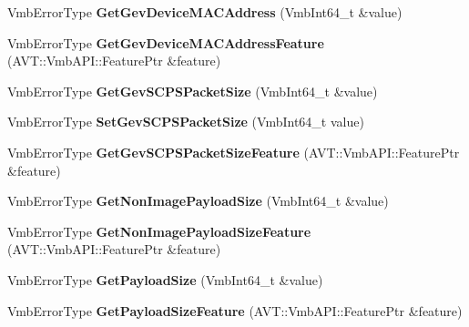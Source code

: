 \begin{DoxyCompactItemize}
\item 
\hypertarget{classMakoCamera_a34e9bc9f5b2c9c218f73f3452f5e5894}{Vmb\-Error\-Type {\bfseries Get\-Gev\-Device\-M\-A\-C\-Address} (Vmb\-Int64\-\_\-t \&value)}\label{classMakoCamera_a34e9bc9f5b2c9c218f73f3452f5e5894}

\item 
\hypertarget{classMakoCamera_abe623f54144fc10ab2dabb682af8cb3a}{Vmb\-Error\-Type {\bfseries Get\-Gev\-Device\-M\-A\-C\-Address\-Feature} (A\-V\-T\-::\-Vmb\-A\-P\-I\-::\-Feature\-Ptr \&feature)}\label{classMakoCamera_abe623f54144fc10ab2dabb682af8cb3a}

\item 
\hypertarget{classMakoCamera_a5780f8389349cbf7fa0438088d2939cb}{Vmb\-Error\-Type {\bfseries Get\-Gev\-S\-C\-P\-S\-Packet\-Size} (Vmb\-Int64\-\_\-t \&value)}\label{classMakoCamera_a5780f8389349cbf7fa0438088d2939cb}

\item 
\hypertarget{classMakoCamera_ab170ff6f7112065435fb91c6c904ce1e}{Vmb\-Error\-Type {\bfseries Set\-Gev\-S\-C\-P\-S\-Packet\-Size} (Vmb\-Int64\-\_\-t value)}\label{classMakoCamera_ab170ff6f7112065435fb91c6c904ce1e}

\item 
\hypertarget{classMakoCamera_af7f766d94d6d60e53f97dc289b6a7bd7}{Vmb\-Error\-Type {\bfseries Get\-Gev\-S\-C\-P\-S\-Packet\-Size\-Feature} (A\-V\-T\-::\-Vmb\-A\-P\-I\-::\-Feature\-Ptr \&feature)}\label{classMakoCamera_af7f766d94d6d60e53f97dc289b6a7bd7}

\item 
\hypertarget{classMakoCamera_a82d2852411e40449c1515c624e6cbe4b}{Vmb\-Error\-Type {\bfseries Get\-Non\-Image\-Payload\-Size} (Vmb\-Int64\-\_\-t \&value)}\label{classMakoCamera_a82d2852411e40449c1515c624e6cbe4b}

\item 
\hypertarget{classMakoCamera_a06fb696cbd6726adb81104f74d5ba842}{Vmb\-Error\-Type {\bfseries Get\-Non\-Image\-Payload\-Size\-Feature} (A\-V\-T\-::\-Vmb\-A\-P\-I\-::\-Feature\-Ptr \&feature)}\label{classMakoCamera_a06fb696cbd6726adb81104f74d5ba842}

\item 
\hypertarget{classMakoCamera_ae3d725b4adb70b06c3b5fecf374420b4}{Vmb\-Error\-Type {\bfseries Get\-Payload\-Size} (Vmb\-Int64\-\_\-t \&value)}\label{classMakoCamera_ae3d725b4adb70b06c3b5fecf374420b4}

\item 
\hypertarget{classMakoCamera_a992cbdb88ce4a96e47e6bb2f4b33bd4d}{Vmb\-Error\-Type {\bfseries Get\-Payload\-Size\-Feature} (A\-V\-T\-::\-Vmb\-A\-P\-I\-::\-Feature\-Ptr \&feature)}\label{classMakoCamera_a992cbdb88ce4a96e47e6bb2f4b33bd4d}


\end{DoxyCompactItemize}
